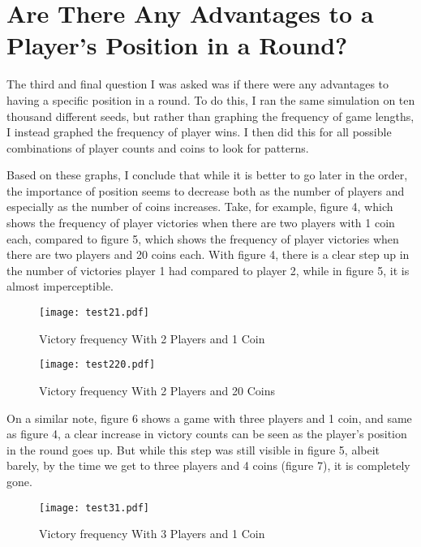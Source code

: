 \documentclass[11pt]{article}
\begin{document}
\section{Are There Any Advantages to a Player's Position in a Round?}

The third and final question I was asked was if there were any advantages to having a specific position in a round. To do this, I ran the same simulation on ten thousand different seeds, but rather than graphing the frequency of game lengths, I instead graphed the frequency of player wins. I then did this for all possible combinations of player counts and coins to look for patterns.

Based on these graphs, I conclude that while it is better to go later in the order, the importance of position seems to decrease both as the number of players and especially as the number of coins increases. Take, for example, figure 4, which shows the frequency of player victories when there are two players with 1 coin each, compared to figure 5, which shows the frequency of player victories when there are two players and 20 coins each. With figure 4, there is a clear step up in the number of victories player 1 had compared to player 2, while in figure 5, it is almost imperceptible.

\begin{figure}[tbp]
\begin{centering}
\texttt{[image: test21.pdf]}
\caption{Victory frequency With 2 Players and 1 Coin}
\end{centering}
\end{figure}

\begin{figure}[tbp]
\begin{centering}
\texttt{[image: test220.pdf]}
\caption{Victory frequency With 2 Players and 20 Coins}
\end{centering}
\end{figure}

On a similar note, figure 6 shows a game with three players and 1 coin, and same as figure 4, a clear increase in victory counts can be seen as the player's position in the round goes up. But while this step was still visible in figure 5, albeit barely, by the time we get to three players and 4 coins (figure 7), it is completely gone.

\begin{figure}[tbp]
\begin{centering}
\texttt{[image: test31.pdf]}
\caption{Victory frequency With 3 Players and 1 Coin}
\end{centering}
\end{figure}
\end{document}
